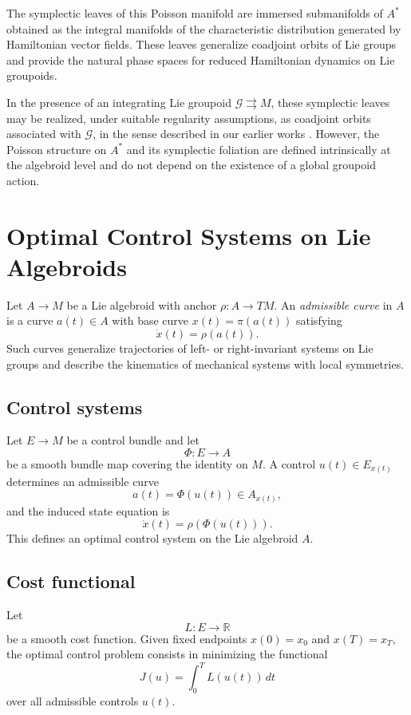 \documentclass{article}
\begin{document}
The symplectic leaves of this Poisson manifold are immersed submanifolds of $A^*$ obtained as the integral manifolds of the characteristic distribution generated by Hamiltonian vector fields.  
These leaves generalize coadjoint orbits of Lie groups and provide the natural phase spaces for reduced Hamiltonian dynamics on Lie groupoids.

In the presence of an integrating Lie groupoid $\mathcal G \rightrightarrows M$, these symplectic leaves may be realized, under suitable regularity assumptions, as coadjoint orbits associated with $\mathcal G$, in the sense described in our earlier works \cite{Hagh,HaghighatdoostAyoubiCoadjoint}.  
However, the Poisson structure on $A^*$ and its symplectic foliation are defined intrinsically at the algebroid level and do not depend on the existence of a global groupoid action.

\section{Optimal Control Systems on Lie Algebroids}

Let $A \to M$ be a Lie algebroid with anchor $\rho : A \to TM$.  
An \emph{admissible curve} in $A$ is a curve $a(t) \in A$ with base curve $x(t)=\pi(a(t))$ satisfying
\[
\dot{x}(t) = \rho(a(t)).
\]
Such curves generalize trajectories of left- or right-invariant systems on Lie groups and describe the kinematics of mechanical systems with local symmetries.

\subsection{Control systems}

Let $E \to M$ be a control bundle and let
\[
\Phi : E \to A
\]
be a smooth bundle map covering the identity on $M$.  
A control $u(t) \in E_{x(t)}$ determines an admissible curve
\[
a(t) = \Phi(u(t)) \in A_{x(t)},
\]
and the induced state equation is
\[
\dot{x}(t) = \rho(\Phi(u(t))).
\]
This defines an optimal control system on the Lie algebroid $A$.

\subsection{Cost functional}

Let
\[
L : E \to \mathbb{R}
\]
be a smooth cost function.  
Given fixed endpoints $x(0)=x_0$ and $x(T)=x_T$, the optimal control problem consists in minimizing the functional
\[
J(u) = \int_0^T L(u(t))\,dt
\]
over all admissible controls $u(t)$.
\end{document}
